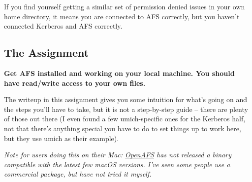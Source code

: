 \documentclass{article}
\begin{document}
If you find yourself getting a similar set of permission denied issues in your
own home directory, it means you are connected to AFS correctly, but you
haven't connected Kerberos and AFS correctly.


\subsection*{The Assignment}

\textbf{Get AFS installed and working on your local machine. You should have
read/write access to your own files.}

The writeup in this assignment gives you some intuition for what's going on
and the steps you'll have to take, but it is not a step-by-step guide -- there
are plenty of those out there (I even found a few umich-specific ones for the
Kerberos half, not that there's anything special you have to do to set things
up to work here, but they use umich as their example).

\emph{Note for users doing this on their Mac:
\href{https://www.openafs.org/}{OpenAFS} has not released a binary compatible
with the latest few macOS versions. I've seen some people use a commercial
package, but have not tried it myself.}
\end{document}
